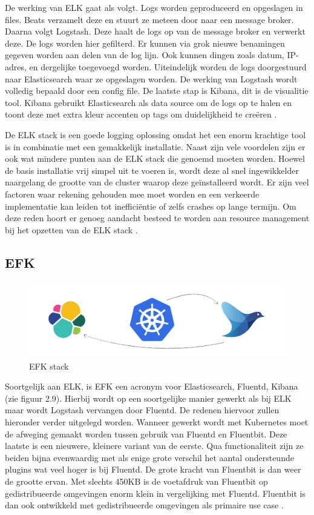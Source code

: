De werking van ELK gaat als volgt. Logs worden geproduceerd en opgeslagen in files. Beats verzamelt deze en stuurt ze meteen door naar een message broker. Daarna volgt Logstash. Deze haalt de logs op van de message broker en verwerkt deze. De logs worden hier gefilterd. Er kunnen via grok nieuwe benamingen gegeven worden aan delen van de log lijn. Ook kunnen dingen zoals datum, IP-adres, en dergelijke toegevoegd worden. Uiteindelijk worden de logs doorgestuurd naar Elasticsearch waar ze opgeslagen worden. De werking van Logstash wordt volledig bepaald door een config file. De laatste stap is Kibana, dit is de visualitie tool. Kibana gebruikt Elasticsearch als data source om de logs op te halen en toont deze met extra kleur accenten op tags om duidelijkheid te creëren \cite{levy2015,berman2018-12}. 

De ELK stack is een goede logging oplossing omdat het een enorm krachtige tool is in combinatie met een gemakkelijk installatie. Naast zijn vele voordelen zijn er ook wat mindere punten aan de ELK stack die genoemd moeten worden. Hoewel de basis installatie vrij simpel uit te voeren is, wordt deze al snel ingewikkelder naargelang de grootte van de cluster waarop deze geïnstalleerd wordt. Er zijn veel factoren waar rekening gehouden mee moet worden en een verkeerde implementatie kan leiden tot inefficiëntie of zelfs crashes op lange termijn. Om deze reden hoort er genoeg aandacht besteed te worden aan resource management bij het opzetten van de ELK stack \autocite{gifford2016}.

\subsection{EFK}

\begin{figure}[ht]
    \centering
    \includegraphics[scale=0.15 ]{img/EFK_logo}
    \caption[EFK stack]{EFK stack \cite{petrausch}}
\end{figure}

Soortgelijk aan ELK, is EFK een acronym voor Elasticsearch, Fluentd, Kibana (zie figuur 2.9). Hierbij wordt op een soortgelijke manier gewerkt als bij ELK maar wordt Logstash vervangen door Fluentd. De redenen hiervoor zullen hieronder verder uitgelegd worden. Wanneer gewerkt wordt met Kubernetes moet de afweging gemaakt worden tussen gebruik van Fluentd en Fluentbit. Deze laatste is een nieuwere, kleinere variant van de eerste. Qua functionaliteit zijn ze beiden bijna evenwaardig met als enige grote verschil het aantal ondersteunde plugins wat veel hoger is bij Fluentd. De grote kracht van Fluentbit is dan weer de grootte ervan. Met slechts 450KB is de voetafdruk van Fluentbit op gedistribueerde omgevingen enorm klein in vergelijking met Fluentd. Fluentbit is dan ook ontwikkeld met gedistribueerde omgevingen als primaire use case \autocite{berman2018-06}.

